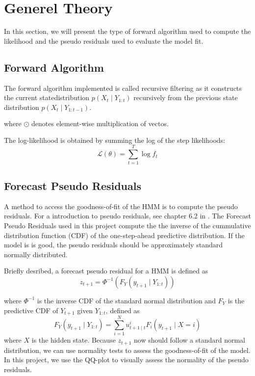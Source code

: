 \section{Generel Theory}
In this section, we will present the type of forward algorithm used to compute the likelihood 
and the pseudo residuals used to evaluate the model fit.


\subsection{Forward Algorithm} 
The forward algorithm implemented is called recursive filtering 
\cite{moler2024statistical} as it constructs the current 
statedistribution $p(X_t \mid Y_{1:t})$ recursively from the previous 
state distribution $p(X_t \mid Y_{1:t-1})$.

where $\odot$ denotes element-wise multiplication of vectos. 
\newline

The log-likelihood is obtained by summing the log of the step likelihoods:
\begin{equation}
    \mathcal{L}(\theta) = \sum_{t=1}^{T} \log f_t
    \label{eq:log_likelihood}
\end{equation}

\subsection{Forecast Pseudo Residuals}
A method to access the goodness-of-fit of the HMM is to compute the 
pseudo residuals. For a introduction to pseudo residuals, see chapter 6.2 in \cite{zucchini2016hidden}. \newline
The Forecast Pseudo Residuals used in this project compute 
the the inverse of the cummulative distribution function (CDF) of
the one-step-ahead predictive distribution. If the model is is good, 
the pseudo residuals should be approximately standard normally distributed. 


Briefly desribed, a forecast pseudo residual for a HMM is defined as
$$
z_{t+1} = \Phi^{-1} (F_Y(y_{t+1}\mid Y_{1:t}))
$$

where $\Phi^{-1}$ is the inverse CDF of the standard normal distribution 
and $F_Y$ is the predictive CDF of $Y_{t+1}$ given $Y_{1:t}$, defined as
$$
F_Y(y_{t+1}\mid Y_{1:t}) = \sum_{i=1}^{N} u_{t+1 \mid t}^i F_i(y_{t+1} \mid X = i)
$$
where $X$ is the hidden state. \newline
Because $z_{t+1}$ now should follow a standard normal distribution, 
we can use normality tests to assess the goodness-of-fit of the model. \newline
In this project, we use the QQ-plot to visually assess the normality of the pseudo residuals. 

